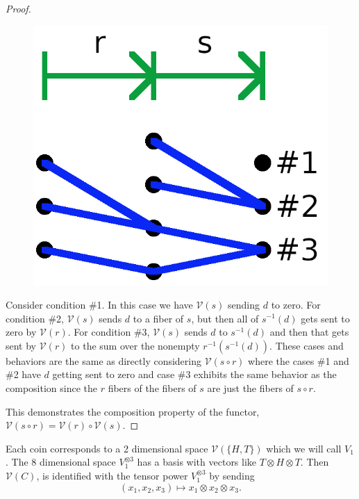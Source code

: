 \documentclass[12pt,a4paper]{article}
\theoremstyle{myrule}
\theoremstyle{postulate}
\theoremstyle{definition}
\begin{document}
\begin{proof}
\begin{figure}[h]
\centering
\includegraphics[scale=1.6]{functor.png}
\end{figure}
  
  Consider condition \#1.  In this case we have $\mathcal{V}(s)$ sending $d$ to zero.  For condition \#2, $\mathcal{V}(s)$ sends $d$ to a fiber of $s$, but then all of $s^{-1}(d)$ gets sent to zero by $\mathcal{V}(r)$.  For condition \#3, $\mathcal{V}(s)$ sends $d$ to $s^{-1}(d)$ and then that gets sent by $\mathcal{V}(r)$ to the sum over the nonempty $r^{-1}(s^{-1}(d))$.  These cases and behaviors are the same as directly considering $\mathcal{V}(s \circ r)$ where the cases \#1 and \#2 have $d$ getting sent to zero and case \#3 exhibits the same behavior as the composition since the $r$ fibers of the fibers of $s$ are just the fibers of $s \circ r$.

  This demonstrates the composition property of the functor, $\mathcal{V}(s \circ r) = \mathcal{V}(r) \circ \mathcal{V}(s)$.
\end{proof}

Each coin corresponds to a 2 dimensional space $\mathcal{V}(\{H,T\})$ which we will call $V_1$.  The 8 dimensional space $V_1 ^ {\otimes 3}$ has a basis with vectors like $T \otimes H \otimes T$.  Then $\mathcal{V}(C)$, is identified with the tensor power $V_1^{\otimes 3}$ by sending
\[
(x_1,x_2,x_3) \mapsto x_1 \otimes x_2 \otimes x_3.
\]
\end{document}
